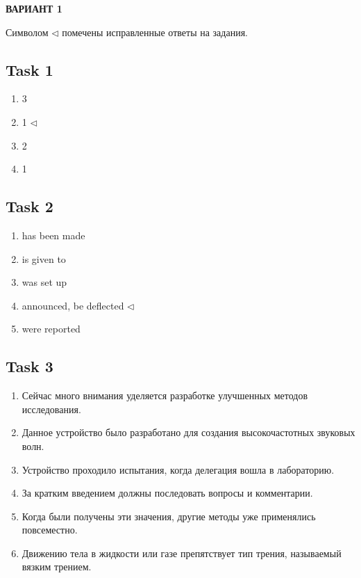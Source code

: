 \begin{center}
	\textbf{ВАРИАНТ 1}
\end{center}

Символом $ \triangleleft $ помечены исправленные ответы на задания.

\subsection*{Task 1}

\begin{enumerate}
	\item 3
	\item 1 $ \triangleleft $
	\item 2
	\item 1
\end{enumerate}

\subsection*{Task 2}

\begin{enumerate}
	\item has been made
	\item is given to
	\item was set up
	\item announced, be deflected $ \triangleleft $
	\item were reported
\end{enumerate}

\subsection*{Task 3}

\begin{enumerate}
	\item Сейчас много внимания уделяется разработке улучшенных методов исследования.
	\item Данное устройство было разработано для создания высокочастотных звуковых волн.
	\item Устройство проходило испытания, когда делегация вошла в лабораторию.
	\item За кратким введением должны последовать вопросы и комментарии.
	\item Когда были получены эти значения, другие методы уже применялись повсеместно.
	\item Движению тела в жидкости или газе препятствует тип трения, называемый вязким трением.
\end{enumerate}

